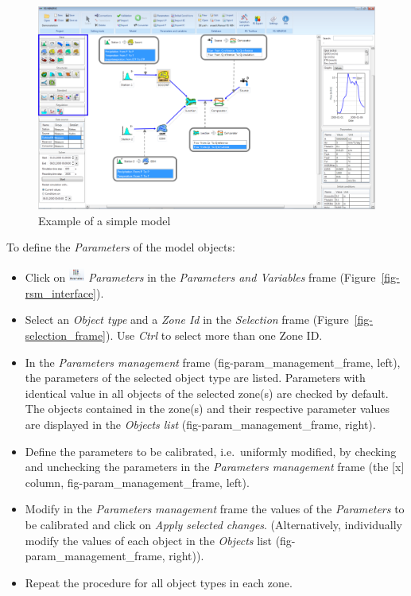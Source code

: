 \documentclass[
  letterpaper,
  DIV=11,
  numbers=noendperiod]{scrreprt}
\begin{document}
\begin{figure}

{\centering \includegraphics{./figures/fig-simple_model_example.png}

}

\caption{\label{fig-simple_model_example}Example of a simple model}

\end{figure}

To define the \emph{Parameters} of the model objects:

\begin{itemize}
\item
  {Click on
  \includegraphics[width=0.2in,height=0.2in]{./figures/fig-parameters_button.png}
  \emph{Parameters} in the \emph{Parameters and Variables} frame
  (Figure~\ref{fig-rsm_interface}).}
\item
  {Select an \emph{Object type} and a \emph{Zone Id} in the
  \emph{Selection} frame (Figure~\ref{fig-selection_frame}). Use
  \emph{Ctrl} to select more than one Zone ID.}
\item
  In the \emph{Parameters management} frame
  (fig-param\_management\_frame, left), the parameters of the selected
  object type are listed. Parameters with identical value in all objects
  of the selected zone(s) are checked by default. The objects contained
  in the zone(s) and their respective parameter values are displayed in
  the \emph{Objects list} (fig-param\_management\_frame, right).
\item
  {Define the parameters to be calibrated, i.e.~uniformly modified, by
  checking and unchecking the parameters in the \emph{Parameters
  management} frame (the {[}x{]} column, fig-param\_management\_frame,
  left).}
\item
  {Modify in the \emph{Parameters management} frame the values of the
  \emph{Parameters} to be calibrated and click on \emph{Apply selected
  changes}. (Alternatively, individually modify the values of each
  object in the \emph{Objects} list (fig-param\_management\_frame,
  right)).}
\item
  {Repeat the procedure for all object types in each zone.}
\end{itemize}
\end{document}
